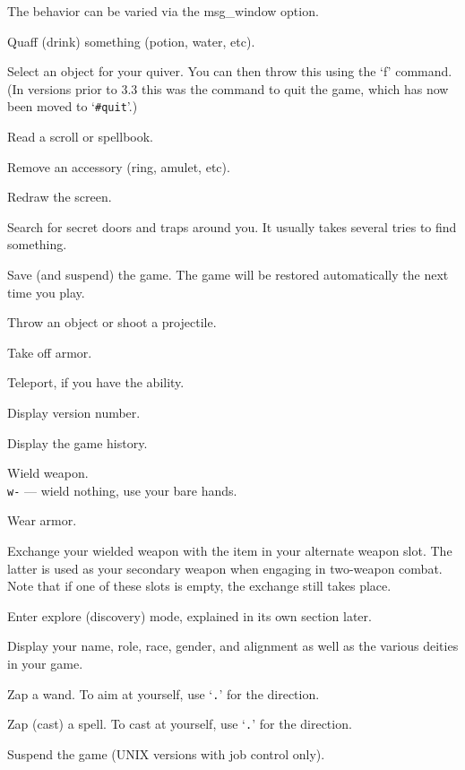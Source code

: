 The behavior can be varied via the msg_window option.
\item[\tb{q}]
Quaff (drink) something (potion, water, etc).
\item[\tb{Q}]
Select an object for your quiver.  You can then throw this using
the `f' command.  (In versions prior to 3.3 this was the command to quit
the game, which has now been moved to `{\tt \#quit}'.)
\item[\tb{r}]
Read a scroll or spellbook.
\item[\tb{R}]
Remove an accessory (ring, amulet, etc).
\item[\tb{\^{}R}]
Redraw the screen.
\item[\tb{s}]
Search for secret doors and traps around you.  It usually takes several
tries to find something.
\item[\tb{S}]
Save (and suspend) the game.  The game will be restored automatically the
next time you play.
\item[\tb{t}]
Throw an object or shoot a projectile.
\item[\tb{T}]
Take off armor.
\item[\tb{\^{}T}]
Teleport, if you have the ability.
\item[\tb{v}]
Display version number.
\item[\tb{V}]
Display the game history.
\item[\tb{w}]
Wield weapon.\\
{\tt w-} --- wield nothing, use your bare hands.
\item[\tb{W}]
Wear armor.
\item[\tb{x}]
Exchange your wielded weapon with the item in your alternate
weapon slot.  The latter is used as your secondary weapon when engaging in
two-weapon combat.  Note that if one of these slots is empty,
the exchange still takes place.
\item[\tb{X}]
Enter explore (discovery) mode, explained in its own section later.
\item[\tb{\^{}X}]
Display your name, role, race, gender, and alignment as well as
the various deities in your game.
\item[\tb{z}]
Zap a wand.  To aim at yourself, use `{\tt .}' for the direction.
\item[\tb{Z}]
Zap (cast) a spell.  To cast at yourself, use `{\tt .}' for the direction.
\item[\tb{\^{}Z}]
Suspend the game (UNIX versions with job control only).
